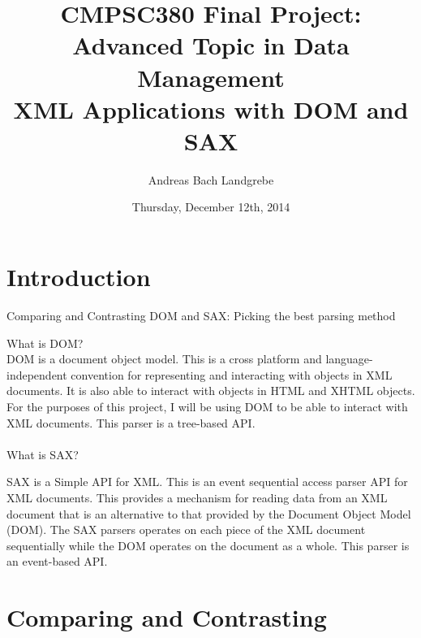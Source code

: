 \documentclass[11pt,english]{article}
\date{Thursday, December 12th, 2014}
\title{CMPSC380 Final Project: Advanced Topic in Data Management \\
XML Applications with DOM and SAX}
\author[1]{Andreas Bach Landgrebe}
\affil[1]{Allegheny College, Department of Computer Science}
\begin{document}
\maketitle
\newpage
\begin{center}

\end{center}
\section{Introduction}
\begin{center}
Comparing and Contrasting DOM and SAX: Picking the best parsing method
\end{center}
What is DOM?
\\
\indent
DOM is a document object model. This is a cross platform and language-independent convention for representing and interacting  with objects in XML documents. It is also able to interact with objects in HTML and XHTML objects. For the purposes of this project, I will be using DOM to be able to interact with XML documents. This parser is a tree-based API. 
\\
\\
What is SAX?
\\
\par
\indent
SAX is a Simple API for XML. This is an event sequential access parser API for XML documents. This provides a mechanism for reading data from an XML document that is an alternative to that provided by the Document Object Model (DOM). The SAX parsers operates on each piece of the XML document sequentially while the DOM operates on the document as a whole. This parser is an event-based API.
\section{Comparing and Contrasting}
\end{document}
